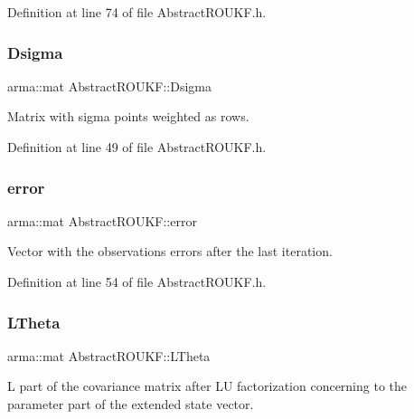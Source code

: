 Definition at line 74 of file Abstract\+R\+O\+U\+K\+F.\+h.

\mbox{\label{classAbstractROUKF_a7f0b59c793a213079124cfce6284e58c}} 
\subsubsection{\texorpdfstring{Dsigma}{Dsigma}}
{\footnotesize\ttfamily arma\+::mat Abstract\+R\+O\+U\+K\+F\+::\+Dsigma\hspace{0.3cm}{\ttfamily [protected]}}

Matrix with sigma points weighted as rows. 

Definition at line 49 of file Abstract\+R\+O\+U\+K\+F.\+h.

\mbox{\label{classAbstractROUKF_a551d0b61b010efe7923358c93cbd0db5}} 
\subsubsection{\texorpdfstring{error}{error}}
{\footnotesize\ttfamily arma\+::mat Abstract\+R\+O\+U\+K\+F\+::error\hspace{0.3cm}{\ttfamily [protected]}}

Vector with the observations errors after the last iteration. 

Definition at line 54 of file Abstract\+R\+O\+U\+K\+F.\+h.

\mbox{\label{classAbstractROUKF_a5c4be89d8f4d3c6ce73e05242bbd1d5e}} 
\subsubsection{\texorpdfstring{L\+Theta}{LTheta}}
{\footnotesize\ttfamily arma\+::mat Abstract\+R\+O\+U\+K\+F\+::\+L\+Theta\hspace{0.3cm}{\ttfamily [protected]}}

L part of the covariance matrix after LU factorization concerning to the parameter part of the extended state vector. 


